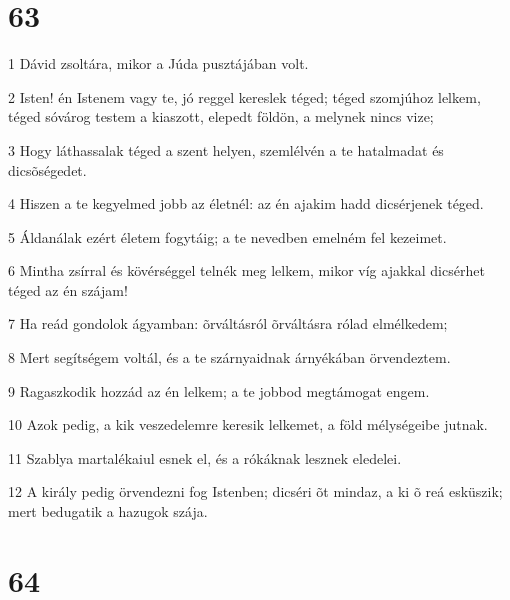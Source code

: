 \chapter{63}

\par 1 Dávid zsoltára, mikor a Júda pusztájában volt.
\par 2 Isten! én Istenem vagy te, jó reggel kereslek téged; téged szomjúhoz lelkem, téged sóvárog testem a kiaszott, elepedt földön, a melynek nincs vize;
\par 3 Hogy láthassalak téged a szent helyen, szemlélvén a te hatalmadat és dicsõségedet.
\par 4 Hiszen a te kegyelmed jobb az életnél: az én ajakim hadd dicsérjenek téged.
\par 5 Áldanálak ezért életem fogytáig; a te nevedben emelném fel kezeimet.
\par 6 Mintha zsírral és kövérséggel telnék meg lelkem, mikor víg ajakkal dicsérhet téged az én szájam!
\par 7 Ha reád gondolok ágyamban: õrváltásról õrváltásra rólad elmélkedem;
\par 8 Mert segítségem voltál, és a te szárnyaidnak árnyékában örvendeztem.
\par 9 Ragaszkodik hozzád az én lelkem; a te jobbod megtámogat engem.
\par 10 Azok pedig, a kik veszedelemre keresik lelkemet, a föld mélységeibe jutnak.
\par 11 Szablya martalékaiul esnek el, és a rókáknak lesznek eledelei.
\par 12 A király pedig örvendezni fog Istenben; dicséri õt mindaz, a ki õ reá esküszik; mert bedugatik a hazugok szája.

\chapter{64}

